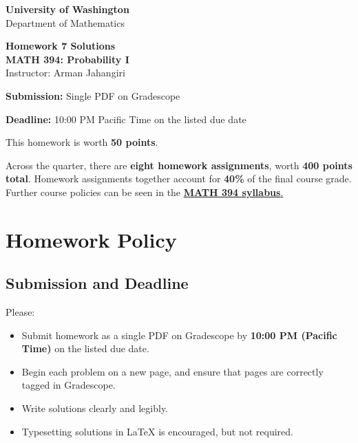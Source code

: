 \documentclass[11pt]{article}
\newcommand{\course}{MATH 394: Probability I}
\newcommand{\department}{Department of Mathematics}
\newcommand{\university}{University of Washington}
\begin{document}
\begin{titlepage}
\centering
\vspace*{1.2cm}

{\Large \textbf{\university}}\\
{\large \department}

\vspace{1.5cm}

{\Huge \color{uwpurple}\textbf{Homework 7 Solutions}}\\[0.25cm]
{\Large \textbf{\course}}\\[0.25cm]
{\large Instructor: Arman Jahangiri}

\vspace{1cm}

\begin{tcolorbox}[width=0.78\textwidth,colback=softpurple,colframe=uwpurple,boxrule=0.9pt,arc=3mm]
\centering
\textbf{Submission:} Single PDF on Gradescope

\textbf{Deadline:} 10:00 PM Pacific Time on the listed due date
\end{tcolorbox}

\vspace{0.8cm}

\begin{tcolorbox}[width=0.86\textwidth,colback=white,colframe=uwgold,boxrule=0.8pt,arc=3mm]
This homework is worth \textbf{50 points}.

Across the quarter, there are \textbf{eight homework assignments}, worth \textbf{400 points total}. Homework assignments together account for \textbf{40\%} of the final course grade. Further course policies can be seen in the \href{https://armanjg.github.io/MATH-394-Probability-1-v2/}{\textbf{MATH 394 syllabus}.}
\end{tcolorbox}

\vfill
\end{titlepage}

\section*{Homework Policy}

\subsection*{Submission and Deadline}

Please:

\begin{itemize}[leftmargin=*]
    \item Submit homework as a single PDF on Gradescope by \textbf{10:00 PM (Pacific Time)} on the listed due date.
    \item Begin each problem on a new page, and ensure that pages are correctly tagged in Gradescope.
    \item Write solutions clearly and legibly.
    \item Typesetting solutions in LaTeX is encouraged, but not required.
\end{itemize}
\end{document}
